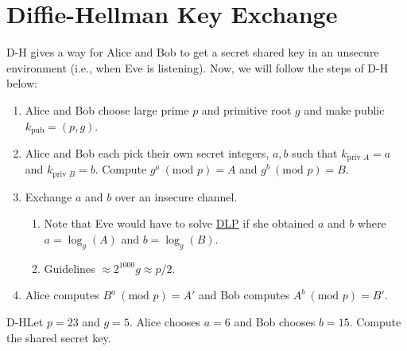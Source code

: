 \section{Diffie-Hellman Key Exchange}

D-H gives a way for Alice and Bob to get a secret shared key in an unsecure environment (i.e., when Eve is listening). Now, we will follow the steps of D-H below:

\begin{enumerate}[label=\arabic*.]
    \item Alice and Bob choose large prime \(p\) and primitive root \(g\) and make public \(k_{\text{pub}} = (p,g)\).
    \item Alice and Bob each pick their own secret integers, \(a,b\) such that \(k_{\text{priv } A} = a\) and \(k_{\text{priv } B} = b\). Compute \(g^a \ (\text{mod } p) = A\) and \(g^b \ (\text{mod } p) = B\).
    \item Exchange \(a\) and \(b\) over an insecure channel.
          \begin{enumerate}[label=\roman*.]
              \item Note that Eve would have to solve \hyperlink{Discrete Logarithm Problem}{DLP} if she obtained \(a\) and \(b\) where \(a = \log_g(A)\) and \(b = \log_g(B)\).
              \item Guidelines \(\approx 2^{1000} g \approx p/2\).
          \end{enumerate}
    \item Alice computes \(B^a \ (\text{mod } p) = A'\) and Bob computes \(A^b \ (\text{mod } p) = B'\).
\end{enumerate}

\begin{example}
    {D-H}Let \(p = 23\) and \(g = 5\). Alice chooses \(a = 6\) and Bob chooses \(b = 15\). Compute the shared secret key.
\end{example}



